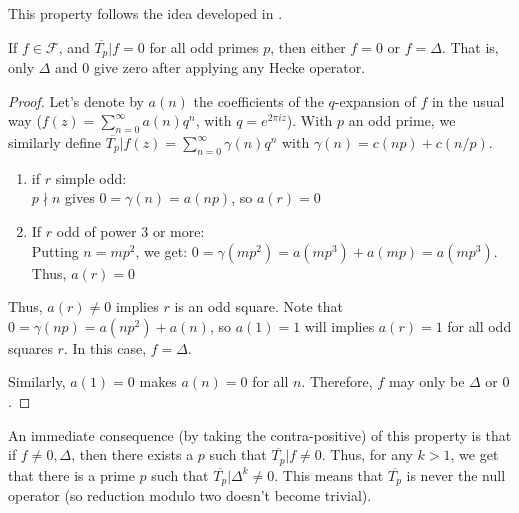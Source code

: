 This property follows the idea developed in \cite[p.33]{TheWebOfModularityArithmeticOfTheCoefficientsOfModularForms}.
\begin{property}
	If $f \in \mathcal{F}$, and $\overline{T_p}|f = 0$ for all odd primes $p$, then either $f = 0$ or $f = \Delta$.
	That is, only $\Delta$ and $0$ give zero after applying any Hecke operator.
\end{property}
\begin{proof}
	Let's denote by $a(n)$ the coefficients of the $q$-expansion of $f$ in the usual way ($f(z) = \sum_{n=0}^{\infty} a(n)q^n$, with $q=e^{2\pi i z}$).
	With $p$ an odd prime, we similarly define $\overline{T_p}|f(z) = \sum_{n=0}^{\infty} \gamma(n)q^n$ with $\gamma(n) = c(np) + c(n/p)$.
	\begin{enumerate}
		\item if $r$ simple odd:\\
		$p \nmid n$ gives $0 = \gamma(n) = a(np)$,
		so $a(r)=0$
		\item If $r$ odd of power 3 or more:\\
		Putting $n=mp^2$, we get: $0 = \gamma(mp^2) = a(mp^3)+a(mp) = a(mp^3)$.\\
		Thus, $a(r)=0$
	\end{enumerate}
	Thus, $a(r) \neq 0$ implies $r$ is an odd square.
	Note that $0 = \gamma(np) = a(np^2) + a(n)$, so $a(1)=1$ will implies $a(r)=1$ for all odd squares $r$.
	In this case, $f = \Delta$.
	
	Similarly, $a(1)=0$ makes $a(n)=0$ for all $n$.
	Therefore, $f$ may only be $\Delta$ or $0$.
\end{proof}

An immediate consequence (by taking the contra-positive) of this property is that if $f \neq 0, \Delta$, then there exists a $p$ such that $\overline{T_p}|f \neq 0$.
Thus, for any $k > 1$, we get that there is a prime $p$ such that $\overline{T_p}|\Delta^k \neq 0$.
This means that $\overline{T_p}$ is never the null operator (so reduction modulo two doesn't become trivial).

